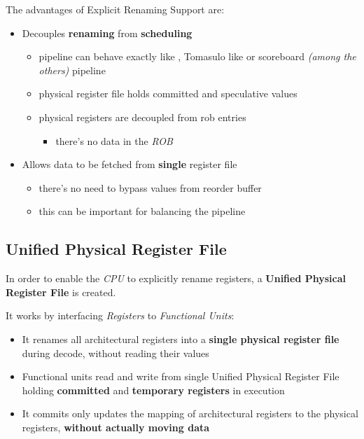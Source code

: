 \documentclass[english]{article}
\begin{document}
The advantages of Explicit Renaming Support are:

\begin{itemize}
  \item Decouples \textbf{renaming} from \textbf{scheduling}
        \begin{itemize}
          \item pipeline can behave exactly like , Tomasulo like or scoreboard \textit{(among the others)} pipeline
          \item physical register file holds committed and speculative values
          \item physical registers are decoupled from rob entries
                \begin{itemize}
                  \item there's no data in the \textit{ROB}
                \end{itemize}
        \end{itemize}
  \item Allows data to be fetched from \textbf{single} register file
        \begin{itemize}
          \item there's no need to bypass values from reorder buffer
          \item this  can be important for balancing the pipeline
        \end{itemize}
\end{itemize}

\subsection{Unified Physical Register File}

In order to enable the \textit{CPU} to explicitly rename registers, a \textbf{Unified Physical Register File} is created.

It works by interfacing \textit{Registers} to \textit{Functional Units}:

\begin{itemize}
  \item It renames all architectural registers into a \textbf{single physical register file} during decode, without reading their values
  \item Functional units read and write from single Unified Physical Register File holding \textbf{committed} and \textbf{temporary registers} in execution
  \item It commits only updates the mapping of architectural registers to the physical registers, \textbf{without actually moving data}
\end{itemize}
\end{document}

